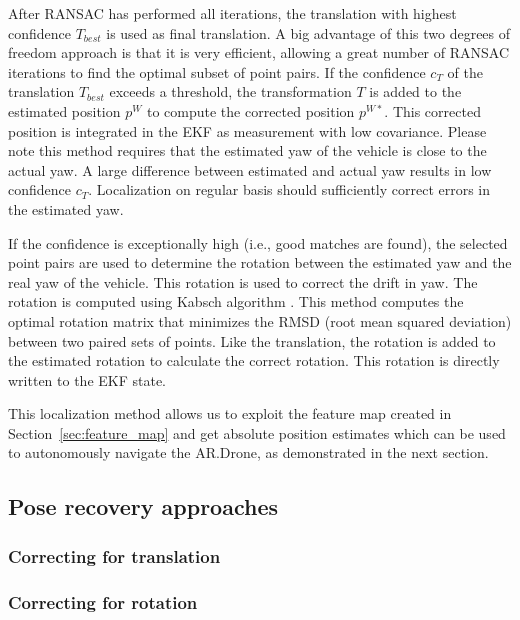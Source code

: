 After RANSAC has performed all iterations, the translation with highest confidence $T_{best}$ is used as final translation.
A big advantage of this two degrees of freedom approach is that it is very efficient, allowing a great number of RANSAC iterations to find the optimal subset of point pairs.
If the confidence $c_{T}$ of the translation $T_{best}$ exceeds a threshold, the transformation $T$ is added to the estimated position $p^W$ to compute the corrected position $p^{W*}$. This corrected position is integrated in the EKF as measurement with low covariance.
Please note this method requires that the estimated yaw of the vehicle is close to the actual yaw.
A large difference between estimated and actual yaw results in low confidence $c_T$.
Localization on regular basis should sufficiently correct errors in the estimated yaw.

If the confidence is exceptionally high (i.e., good matches are found), the selected point pairs are used to determine the rotation between the estimated yaw and the real yaw of the vehicle. This rotation is used to correct the drift in yaw.
The rotation is computed using Kabsch algorithm \cite{Kabsch:a12999}.
This method computes the optimal rotation matrix that minimizes the RMSD (root mean squared deviation) between two paired sets of points.
Like the translation, the rotation is added to the estimated rotation to calculate the correct rotation. This rotation is directly written to the EKF state.

This localization method allows us to exploit the feature map created in Section~\ref{sec:feature_map} and get absolute position estimates which can be used to autonomously navigate the AR.Drone, as demonstrated in the next section.


		\subsection{Pose recovery approaches}
			\subsubsection{Correcting for translation}
			\subsubsection{Correcting for rotation}

